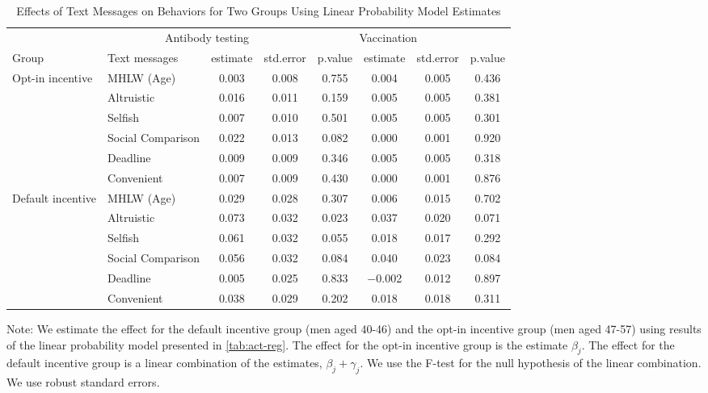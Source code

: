 \begin{table}

\caption{Effects of Text Messages on Behaviors for Two Groups Using Linear Probability Model Estimates \label{tab:act-reg-ftest}}
\centering
\fontsize{9}{11}\selectfont
\begin{threeparttable}
\begin{tabular}[t]{>{\raggedright\arraybackslash}p{5em}lcccccc}
\toprule
\multicolumn{2}{c}{ } & \multicolumn{3}{c}{Antibody testing} & \multicolumn{3}{c}{Vaccination} \\
\cmidrule(l{3pt}r{3pt}){3-5} \cmidrule(l{3pt}r{3pt}){6-8}
Group & Text messages & estimate & std.error & p.value & estimate  & std.error  & p.value \\
\midrule
Opt-in incentive & MHLW (Age) & \num{0.003} & \num{0.008} & \num{0.755} & \num{0.004} & \num{0.005} & \num{0.436}\\
 & Altruistic & \num{0.016} & \num{0.011} & \num{0.159} & \num{0.005} & \num{0.005} & \num{0.381}\\
 & Selfish & \num{0.007} & \num{0.010} & \num{0.501} & \num{0.005} & \num{0.005} & \num{0.301}\\
 & Social Comparison & \num{0.022} & \num{0.013} & \num{0.082} & \num{0.000} & \num{0.001} & \num{0.920}\\
 & Deadline & \num{0.009} & \num{0.009} & \num{0.346} & \num{0.005} & \num{0.005} & \num{0.318}\\
 & Convenient & \num{0.007} & \num{0.009} & \num{0.430} & \num{0.000} & \num{0.001} & \num{0.876}\\
Default incentive & MHLW (Age) & \num{0.029} & \num{0.028} & \num{0.307} & \num{0.006} & \num{0.015} & \num{0.702}\\
 & Altruistic & \num{0.073} & \num{0.032} & \num{0.023} & \num{0.037} & \num{0.020} & \num{0.071}\\
 & Selfish & \num{0.061} & \num{0.032} & \num{0.055} & \num{0.018} & \num{0.017} & \num{0.292}\\
 & Social Comparison & \num{0.056} & \num{0.032} & \num{0.084} & \num{0.040} & \num{0.023} & \num{0.084}\\
 & Deadline & \num{0.005} & \num{0.025} & \num{0.833} & \num{-0.002} & \num{0.012} & \num{0.897}\\
 & Convenient & \num{0.038} & \num{0.029} & \num{0.202} & \num{0.018} & \num{0.018} & \num{0.311}\\
\bottomrule
\end{tabular}
\begin{tablenotes}
\item Note: We estimate the effect for the default incentive group (men aged 40-46) and the opt-in incentive group (men aged 47-57) using results of the linear probability model presented in \ref{tab:act-reg}. The effect for the opt-in incentive group is the estimate $\beta_j$. The effect for the default incentive group is a linear combination of the estimates, $\beta_j + \gamma_j$. We use the F-test for the null hypothesis of the linear combination. We use robust standard errors.
\end{tablenotes}
\end{threeparttable}
\end{table}
